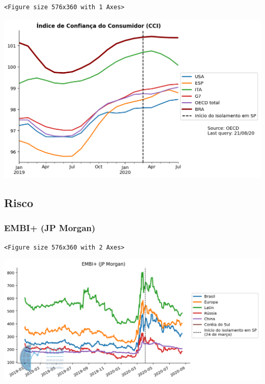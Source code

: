 \documentclass[11pt]{article}
\begin{document}
\begin{verbatim}
<Figure size 576x360 with 1 Axes>
\end{verbatim}


\begin{center}
\includegraphics[width=.9\linewidth]{obipy-resources/62e383af79e91b63c7fc98dd7fb55b3c3ececcb9/f68f8b6cb09da9311b88232927b50a8f0f94cb40.png}
\end{center}

\subsection{Risco}
\label{sec:orgf957c73}

\subsubsection{EMBI+ (JP Morgan)}
\label{sec:orgd660997}

\begin{verbatim}
<Figure size 576x360 with 2 Axes>
\end{verbatim}


\begin{center}
\includegraphics[width=.9\linewidth]{obipy-resources/62e383af79e91b63c7fc98dd7fb55b3c3ececcb9/c50dfc43d174b7c73e73e951c62430709a829874.png}
\end{center}
\end{document}
